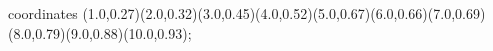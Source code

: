 					coordinates { (1.0,0.27)(2.0,0.32)(3.0,0.45)(4.0,0.52)(5.0,0.67)(6.0,0.66)(7.0,0.69)(8.0,0.79)(9.0,0.88)(10.0,0.93)};